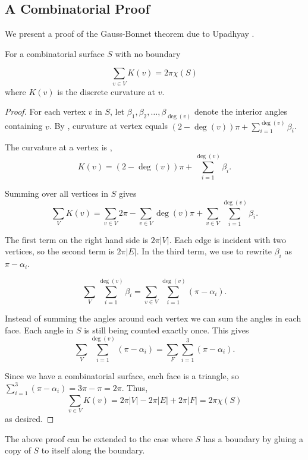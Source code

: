 \subsection{A Combinatorial Proof}
\label{sec:proof}


We present a proof of the Gauss-Bonnet theorem due to Upadhyay \cite{upadhyay2015}.



\begin{theorem}\label{thm:g-b-discete-bdy}
For a combinatorial surface $S$ with no boundary

$$\sum_{v\in V} K(v)=2\pi \chi(S)$$
where $K(v)$ is the discrete curvature at $v$.
\end{theorem}

\begin{proof}

For each vertex $v$ in $S$,
let $\beta_1,\beta_2,\ldots,\beta_{\deg{(v)}}$ denote the interior angles
containing $v$.
By , curvature at vertex equals $(2-\deg{(v)})\pi +\sum_{i=1}^{\deg{(v)}} \beta_i$.

The curvature at a vertex is ,
 $$K(v)=(2-\deg{(v)})\pi +\sum_{i=1}^{\deg{(v)}} \beta_i.$$

Summing over all vertices in $S$ gives
$$\sum_{V} K(v)=\sum_{v\in V}2\pi - \sum_{v\in V}\deg{(v)}\pi+\sum_{v\in V}\sum_{i=1}^{\deg{(v)}} \beta_i.$$

The first term on the right hand side is $2\pi |V|$. Each edge is incident with two vertices, so the second term is $2\pi |E|$. 
In the third term, we use  to rewrite $\beta_i$ as $\pi-\alpha_i$.

$$ \sum_{V}\sum_{i=1}^{\deg{(v)}} \beta_i= \sum_{v\in V}\sum_{i=1}^{\deg{(v)}} (\pi-\alpha_i).$$

Instead of summing the angles around each vertex we can sum the angles in each face.
Each angle in $S$ is still being counted exactly once. This gives
$$\sum_{V}\sum_{i=1}^{\deg{(v)}} (\pi-\alpha_i)=\sum_F\sum_{i=1}^3(\pi-\alpha_i).$$

Since we have a combinatorial surface, each face is a triangle,
so $\sum_{i=1}^3(\pi-\alpha_i)=3\pi-\pi=2\pi.$
Thus, $$\sum_{v\in V} K(v)=2\pi |V|-2\pi |E|+2\pi |F|=2\pi \chi(S)$$ as desired.
\end{proof}

The above proof can be extended to the case where $S$ has a boundary
by gluing a copy of $S$ to itself along the boundary.

